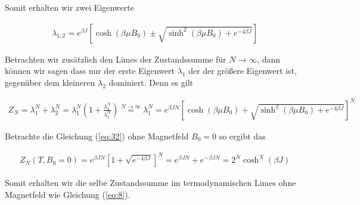 Somit erhalten wir zwei Eigenwerte

\begin{align}
  \label{eq:31}
 \lambda_{1,2}  =  e^{\beta J}\left[\cosh(\beta \mu B_0)\pm \sqrt{\sinh^2(\beta \mu B_0) + e^{-4\beta J}   } \right]
\end{align}

Betrachten wir zusätzlich den Limes der Zustandssumme für \(N\to\infty\), dann können wir sagen dass nur der erste Eigenwert \(\lambda_1\) der der größere Eigenwert ist, gegenüber dem kleineren \(\lambda_2\) dominiert. Denn es gilt

\begin{align}
  \label{eq:32}
  Z_N = \lambda_1^N + \lambda_2^N = \lambda_1^N\left( 1 + \frac{\lambda_2^N}{\lambda_1^N}  \right) \stackrel{N\to\infty} = \lambda_1^N = e^{\beta J N}\left[\cosh(\beta \mu B_0)+ \sqrt{\sinh^2(\beta \mu B_0) + e^{-4\beta J}   } \right]^N
\end{align}

Betrachte die Gleichung (\ref{eq:32}) ohne Magnetfeld \(B_0=0\) so ergibt das

\begin{align}
  \label{eq:33}
  Z_N(T,B_0=0) = e^{\beta J N}\left[1+ \sqrt{ e^{-4\beta J}   } \right]^N = e^{\beta J N}+ e^{-\beta J N} =2^N\cosh^N(\beta J)
\end{align}

Somit erhalten wir die selbe Zustandssumme im termodynamischen Limes ohne Magnetfeld wie Gleichung (\ref{eq:8}).



